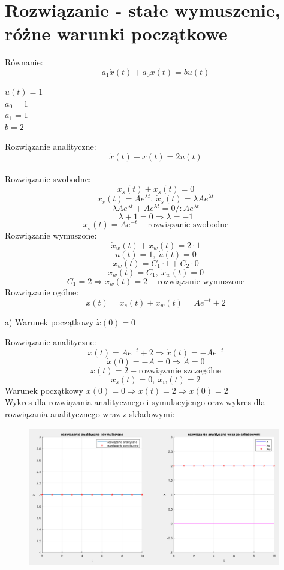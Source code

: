 \documentclass{article}
\begin{document}
\section{Rozwiązanie - stałe wymuszenie, różne warunki początkowe}
Równanie:
$$
a_1\dot{x}(t)+a_0x(t)=bu(t)
$$
\begin{center}
    $u(t)=1$\\
    $a_0=1$\\
    $a_1=1$\\
    $b=2$\\
\end{center}
Rozwiązanie analityczne:\\
$$\dot{x}(t)+x(t)=2u(t)$$\\
Rozwiązanie swobodne:
$$
\dot{x}_s(t)+x_s(t)=0
$$
$$
x_s(t)=Ae^{\lambda t}, \ \dot{x}_s(t)=\lambda Ae^{\lambda t}
$$
$$
\lambda Ae^{\lambda t}+Ae^{\lambda t}=0/:Ae^{\lambda t}
$$
$$
\lambda+1=0\Rightarrow \lambda=-1
$$
$$
x_s(t)=Ae^{-t} - \text{rozwiązanie swobodne}
$$
Rozwiązanie wymuszone:
$$
\dot{x}_w(t)+x_w(t)=2\cdot1
$$
$$
u(t)=1, \ \dot{u}(t)=0
$$
$$
x_w(t)=C_1\cdot1+C_2\cdot0
$$
$$
x_w(t)=C_1, \ \dot{x}_w(t)=0
$$
$$
C_1=2\Rightarrow x_w(t)=2 -\text{rozwiązanie wymuszone}
$$
Rozwiązanie ogólne:
$$
x(t)=x_s(t)+x_w(t)=Ae^{-t}+2
$$
\begin{flushleft}
    a) Warunek początkowy $\dot{x}(0)=0$
\end{flushleft}
Rozwiązanie analityczne:
$$
x(t)=Ae^{-t}+2 \Rightarrow \dot{x}(t)=-Ae^{-t}
$$
$$
\dot{x}(0)=-A=0\Rightarrow A=0
$$
$$
x(t)=2-\text{rozwiązanie szczególne}
$$
$$
x_s(t)=0, \ x_w(t)=2
$$
Warunek początkowy $\dot{x}(0)=0\Rightarrow x(t)=2 \Rightarrow x(0)=2$\\
Wykres dla rozwiązania analitycznego i symulacyjengo oraz wykres dla rozwiązania analitycznego wraz z składowymi:
\newpage
\begin{figure}[h!]
    \centering
    \includegraphics[width=0.985\textwidth]{poprawaBBBBBB.png}
    \label{fig:my_label}
\end{figure}
\end{document}
